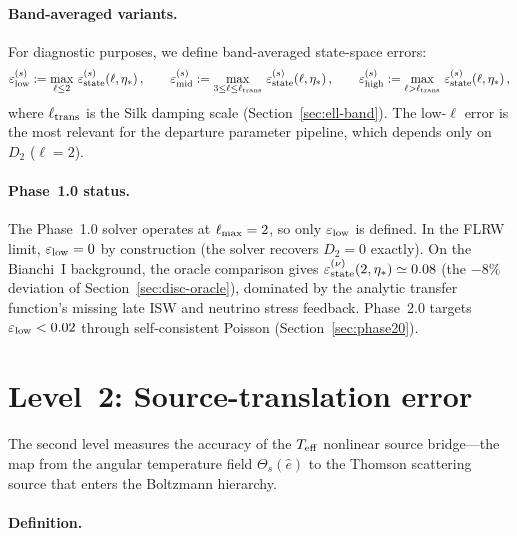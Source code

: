 \paragraph{Band-averaged variants.}

For diagnostic purposes, we define band-averaged
state-space errors:
\begin{equation}\label{eq:err-state-band}
\varepsilon_{\rm low}^{(s)}
:= \max_{\ell \leq 2}\,
  \varepsilon_{\rm state}^{(s)}(\ell, \eta_*)\,,
\qquad
\varepsilon_{\rm mid}^{(s)}
:= \max_{3 \leq \ell \leq \ell_{\rm trans}}\,
  \varepsilon_{\rm state}^{(s)}(\ell, \eta_*)\,,
\qquad
\varepsilon_{\rm high}^{(s)}
:= \max_{\ell > \ell_{\rm trans}}\,
  \varepsilon_{\rm state}^{(s)}(\ell, \eta_*)\,,
\end{equation}
where $\ell_{\rm trans}$ is the Silk damping scale
(Section~\ref{sec:ell-band}).  The low-$\ell$ error is
the most relevant for the departure parameter pipeline,
which depends only on $D_2$ ($\ell = 2$).


\paragraph{Phase~1.0 status.}

The Phase~1.0 solver operates at $\ell_{\rm max} = 2$, so
only $\varepsilon_{\rm low}$ is defined.  In the FLRW
limit, $\varepsilon_{\rm low} = 0$ by construction (the
solver recovers $D_2 = 0$ exactly).  On the Bianchi~I
background, the oracle comparison gives
$\varepsilon_{\rm state}^{(\nu)}(2, \eta_*) \simeq 0.08$
(the $-8\%$ deviation of
Section~\ref{sec:disc-oracle}), dominated by the
analytic transfer function's missing late ISW and
neutrino stress feedback.  Phase~2.0 targets
$\varepsilon_{\rm low} < 0.02$ through self-consistent
Poisson (Section~\ref{sec:phase20}).


\section{Level~2: Source-translation error}
\label{sec:err-source}

The second level measures the accuracy of the $T_{\mathrm{eff}}$
nonlinear source bridge---the map from the angular
temperature field $\Theta_s(\hat{e})$ to the Thomson
scattering source that enters the Boltzmann hierarchy.


\paragraph{Definition.}

